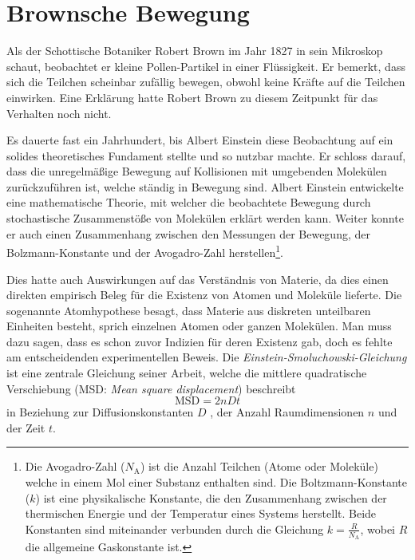 %
%
%
%

\section{Brownsche Bewegung\label{brown:BrownBewegung}}

Als der Schottische Botaniker Robert Brown im Jahr 1827 in sein Mikroskop schaut, beobachtet er kleine Pollen-Partikel in einer Flüssigkeit. Er bemerkt, dass sich die Teilchen scheinbar zufällig bewegen, obwohl keine Kräfte auf die Teilchen einwirken. Eine Erklärung hatte Robert Brown zu diesem Zeitpunkt für das Verhalten noch nicht.


Es dauerte fast ein Jahrhundert, bis Albert Einstein diese Beobachtung auf ein solides theoretisches Fundament stellte und so nutzbar machte. Er schloss darauf, dass die unregelmäßige Bewegung auf Kollisionen mit umgebenden Molekülen zurückzuführen ist, welche ständig in Bewegung sind. Albert Einstein entwickelte eine mathematische Theorie, mit welcher die beobachtete Bewegung durch stochastische Zusammenstöße von Molekülen erklärt werden kann. Weiter konnte er auch einen Zusammenhang zwischen den Messungen der Bewegung, der Bolzmann-Konstante und der  Avogadro-Zahl herstellen\footnote{Die Avogadro-Zahl ($N_\mathrm{A}$) ist die Anzahl Teilchen (Atome oder Moleküle) welche in einem Mol einer Substanz enthalten sind. Die Boltzmann-Konstante ($k$) ist eine physikalische Konstante, die den Zusammenhang zwischen der thermischen Energie und der Temperatur eines Systems herstellt. Beide Konstanten sind miteinander verbunden durch die Gleichung $k = \frac{R}{N_\mathrm{A}}$, wobei $R$ die allgemeine Gaskonstante ist.}.


Dies hatte auch Auswirkungen auf das Verständnis von Materie, da dies einen direkten empirisch Beleg für die Existenz von Atomen und Moleküle lieferte. Die sogenannte Atomhypothese besagt, dass Materie aus diskreten unteilbaren Einheiten besteht, sprich einzelnen Atomen oder ganzen Molekülen. 
Man muss dazu sagen, dass es schon zuvor Indizien für deren Existenz gab, doch es fehlte am entscheidenden experimentellen Beweis.
Die \textit{Einstein-Smoluchowski-Gleichung} ist eine zentrale Gleichung seiner Arbeit, welche die mittlere quadratische Verschiebung (MSD: \textit{Mean square displacement}) beschreibt
\begin{equation}
	\mathrm{MSD} = 2nDt
\end{equation}
in Beziehung zur Diffusionskonstanten $ D $ , der Anzahl Raumdimensionen $ n $ und der Zeit $ t $.

